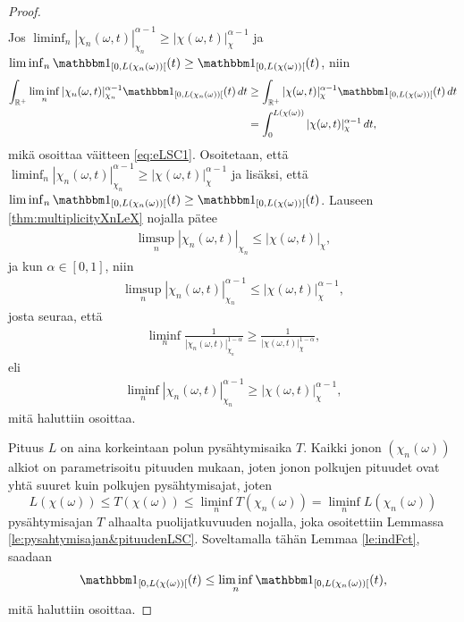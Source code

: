 \documentclass[12pt,oneside,a4paper]{amsbook} %
\begin{document}
\begin{proof}
\begin{align*}
    \end{align*}
    Jos $\liminf_n |\chi_n(\omega, t)|_{\chi_n}^{\alpha-1} \ge |\chi(\omega, t)|_{\chi}^{\alpha-1}$ ja $\liminf_n \indfct{[0, L(\chi_n(\omega))[}(t) \ge \indfct{[0, L(\chi(\omega))[}(t)$, niin
    \begin{align*}
        \int_\Rp \liminf_{n} |\chi_n(\omega, t)|_{\chi_n}^{\alpha-1} \indfct{[0, L(\chi_n(\omega))[}(t) \, dt &\ge \int_\Rp|\chi(\omega, t)|_{\chi}^{\alpha-1} \indfct{[0, L(\chi(\omega))[}(t) \, dt \\
        &= \int_0^{L(\chi(\omega))} |\chi(\omega, t)|_{\chi}^{\alpha-1} \, dt,
    \end{align*}
    mikä osoittaa väitteen \eqref{eq:eLSC1}. Osoitetaan, että $ \liminf_n |\chi_n(\omega, t)|_{\chi_n}^{\alpha-1} \ge |\chi(\omega, t)|_{\chi}^{\alpha-1}$ ja lisäksi, että $ \liminf_n \indfct{[0, L(\chi_n(\omega))[}(t) \ge \indfct{[0, L(\chi(\omega))[}(t)$.
    Lauseen \ref{thm:multiplicityXnLeX} nojalla pätee
    \begin{align*}
        \limsup_n|\chi_n(\omega, t)|_{\chi_n} \le |\chi(\omega, t)|_\chi,
    \end{align*}
    ja kun $\alpha \in [0, 1]$, niin 
    \begin{align*}
        \limsup_n|\chi_n(\omega, t)|_{\chi_n}^{\alpha-1} \le |\chi(\omega, t)|_\chi^{\alpha-1},
    \end{align*}
    josta seuraa, että
    \begin{align*}
        \liminf_n\frac{1}{|\chi_n(\omega, t)|_{\chi_n}^{1-\alpha}} \ge \frac{1}{|\chi(\omega, t)|_{\chi}^{1-\alpha}},
    \end{align*}
    eli
    \begin{align*}
        \liminf_n{|\chi_n(\omega, t)|_{\chi_n}^{\alpha-1}} \ge |\chi(\omega, t)|_{\chi}^{\alpha-1},
    \end{align*}
    mitä haluttiin osoittaa. 
    
    Pituus $L$ on aina korkeintaan polun pysähtymisaika $T$. Kaikki jonon $(\chi_n(\omega))$ alkiot on parametrisoitu pituuden mukaan, joten jonon polkujen pituudet ovat yhtä suuret kuin polkujen pysähtymisajat, joten $$L(\chi(\omega)) \le T(\chi(\omega)) \le \liminf_n T(\chi_n(\omega)) = \liminf_n L(\chi_n(\omega))$$ pysähtymisajan $T$ alhaalta puolijatkuvuuden nojalla, joka osoitettiin Lemmassa \ref{le:pysahtymisajan&pituudenLSC}.  Soveltamalla tähän Lemmaa \ref{le:indFct}, saadaan
    \begin{equation*}
        \indfct{[0, L(\chi(\omega))[}(t) \le \liminf_{n} \indfct{[0, L(\chi_n(\omega))[}(t),
    \end{equation*}
    mitä haluttiin osoittaa.
    

\end{proof}
\end{document}
